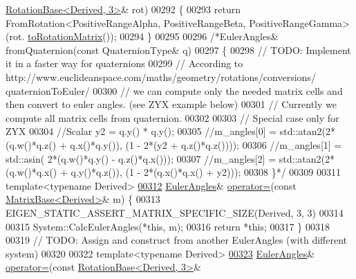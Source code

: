 \begin{DoxyCode}
      \hyperlink{class_eigen_1_1_rotation_base}{RotationBase<Derived, 3>}& rot)
00292       \{
00293         \textcolor{keywordflow}{return} FromRotation<PositiveRangeAlpha, PositiveRangeBeta, PositiveRangeGamma>(rot.
      \hyperlink{class_eigen_1_1_rotation_base_aac726e89402a427c605514ce31b01e42}{toRotationMatrix}());
00294       \}
00295       
00296       \textcolor{comment}{/*EulerAngles& fromQuaternion(const QuaternionType& q)}
00297 \textcolor{comment}{      \{}
00298 \textcolor{comment}{        // TODO: Implement it in a faster way for quaternions}
00299 \textcolor{comment}{        // According to http://www.euclideanspace.com/maths/geometry/rotations/conversions/
      quaternionToEuler/}
00300 \textcolor{comment}{        //  we can compute only the needed matrix cells and then convert to euler angles. (see ZYX example
       below)}
00301 \textcolor{comment}{        // Currently we compute all matrix cells from quaternion.}
00302 \textcolor{comment}{}
00303 \textcolor{comment}{        // Special case only for ZYX}
00304 \textcolor{comment}{        //Scalar y2 = q.y() * q.y();}
00305 \textcolor{comment}{        //m\_angles[0] = std::atan2(2*(q.w()*q.z() + q.x()*q.y()), (1 - 2*(y2 + q.z()*q.z())));}
00306 \textcolor{comment}{        //m\_angles[1] = std::asin( 2*(q.w()*q.y() - q.z()*q.x()));}
00307 \textcolor{comment}{        //m\_angles[2] = std::atan2(2*(q.w()*q.x() + q.y()*q.z()), (1 - 2*(q.x()*q.x() + y2)));}
00308 \textcolor{comment}{      \}*/}
00309       
00311       \textcolor{keyword}{template}<\textcolor{keyword}{typename} Derived>
\hyperlink{class_eigen_1_1_euler_angles_af11e32e3584251f0dce65811ac6ad3b4}{00312}       \hyperlink{class_eigen_1_1_euler_angles}{EulerAngles}& \hyperlink{class_eigen_1_1_euler_angles_af11e32e3584251f0dce65811ac6ad3b4}{operator=}(\textcolor{keyword}{const} \hyperlink{group___core___module_class_eigen_1_1_matrix_base}{MatrixBase<Derived>}& m) \{
00313         EIGEN\_STATIC\_ASSERT\_MATRIX\_SPECIFIC\_SIZE(Derived, 3, 3)
00314         
00315         System::CalcEulerAngles(*\textcolor{keyword}{this}, m);
00316         \textcolor{keywordflow}{return} *\textcolor{keyword}{this};
00317       \}
00318 
00319       \textcolor{comment}{// TODO: Assign and construct from another EulerAngles (with different system)}
00320       
00322       \textcolor{keyword}{template}<\textcolor{keyword}{typename} Derived>
\hyperlink{class_eigen_1_1_euler_angles_abc2256872ea7e285cb915b8af82b6810}{00323}       \hyperlink{class_eigen_1_1_euler_angles}{EulerAngles}& \hyperlink{class_eigen_1_1_euler_angles_abc2256872ea7e285cb915b8af82b6810}{operator=}(\textcolor{keyword}{const} \hyperlink{class_eigen_1_1_rotation_base}{RotationBase<Derived, 3>}& 

\end{DoxyCode}
